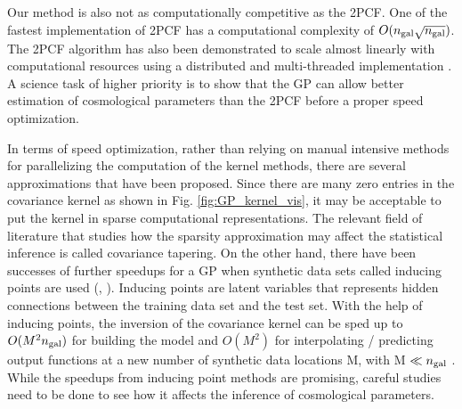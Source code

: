 Our method is also not as computationally competitive as the 2PCF. One of
the fastest implementation of 2PCF has a computational complexity of
$O(n_{\rm gal}\sqrt{n_{\rm gal}})$.
The 2PCF algorithm has also been demonstrated to scale almost linearly with
computational resources 
using a distributed and multi-threaded implementation \citep{Chhugani2012}. 
A science task of higher priority is to show that the GP can allow better estimation of
cosmological parameters than the 2PCF before a proper speed optimization. 

In terms of speed optimization, rather than relying on manual intensive methods 
for parallelizing the computation of the kernel methods, there are several 
approximations that have been proposed. 
Since there are many zero entries in the covariance kernel as shown in
Fig. \ref{fig:GP_kernel_vis}, it may be acceptable to put the kernel in sparse
computational representations. The relevant field of literature that studies how the sparsity
approximation may affect the statistical inference is called covariance tapering. 
On the other hand, there have been successes of further speedups for a GP when 
 synthetic data sets called inducing points are used (\citealt{Snelson2006},
\citealt{Rasmussen2006}). Inducing points are latent variables that represents
hidden connections between the training data set and the test set. With the help 
of inducing points,
the inversion of the covariance kernel can be sped up to
$O(M^2 n_{\rm gal})$ for
building the model and $O(M^2)$ for interpolating / predicting output functions
at a new number of synthetic data locations M, with M $\ll n_{\rm gal}$ 
\citep{Snelson2006}. While the speedups from inducing point methods are
promising, careful studies need to be done to see how it affects the
inference of cosmological parameters.
  
